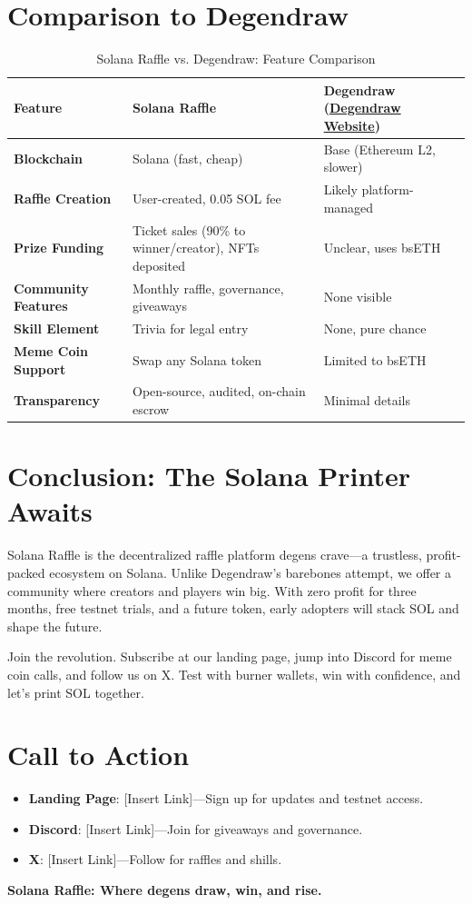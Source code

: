 \documentclass[12pt]{article}
\begin{document}
\section{Comparison to Degendraw}
\begin{table}[h]
\centering
\begin{tabular}{|l|p{6cm}|p{6cm}|}
\hline
\textbf{Feature} & \textbf{Solana Raffle} & \textbf{Degendraw} (\href{https://degendraw.vercel.app/}{Degendraw Website}) \\
\hline
\textbf{Blockchain} & Solana (fast, cheap) & Base (Ethereum L2, slower) \\
\hline
\textbf{Raffle Creation} & User-created, 0.05 SOL fee & Likely platform-managed \\
\hline
\textbf{Prize Funding} & Ticket sales (90\% to winner/creator), NFTs deposited & Unclear, uses bsETH \\
\hline
\textbf{Community Features} & Monthly raffle, governance, giveaways & None visible \\
\hline
\textbf{Skill Element} & Trivia for legal entry & None, pure chance \\
\hline
\textbf{Meme Coin Support} & Swap any Solana token & Limited to bsETH \\
\hline
\textbf{Transparency} & Open-source, audited, on-chain escrow & Minimal details \\
\hline
\end{tabular}
\caption{Solana Raffle vs. Degendraw: Feature Comparison}
\end{table}

\section{Conclusion: The Solana Printer Awaits}
Solana Raffle is the decentralized raffle platform degens crave—a trustless, profit-packed ecosystem on Solana. Unlike Degendraw’s barebones attempt, we offer a community where creators and players win big. With zero profit for three months, free testnet trials, and a future token, early adopters will stack SOL and shape the future.

Join the revolution. Subscribe at our landing page, jump into Discord for meme coin calls, and follow us on X. Test with burner wallets, win with confidence, and let’s print SOL together.

\section{Call to Action}
\begin{itemize}
    \item \textbf{Landing Page}: [Insert Link]—Sign up for updates and testnet access.
    \item \textbf{Discord}: [Insert Link]—Join for giveaways and governance.
    \item \textbf{X}: [Insert Link]—Follow for raffles and shills.
\end{itemize}

\textbf{Solana Raffle: Where degens draw, win, and rise.}
\end{document}
